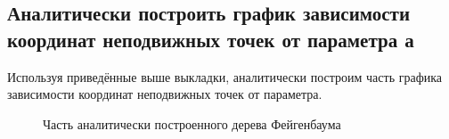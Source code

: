 \documentclass[12pt, a4paper]{article}
\begin{document}
\subsection{Аналитически построить график зависимости координат неподвижных точек от параметра а}
Используя приведённые выше выкладки, аналитически построим часть графика зависимости координат неподвижных точек от параметра.
\begin{figure}[H]
	\caption{Часть аналитически построенного дерева Фейгенбаума}
\end{figure}
\end{document}
